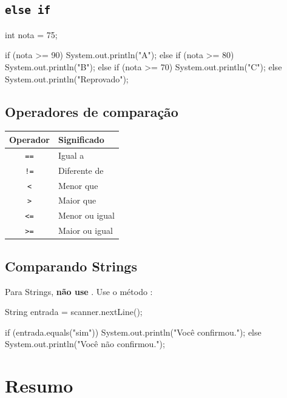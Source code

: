 \documentclass[11pt,a4paper]{article}
\begin{document}
\subsection{\texttt{else if}}

\begin{javacode}
int nota = 75;

if (nota >= 90) {
    System.out.println("A");
} else if (nota >= 80) {
    System.out.println("B");
} else if (nota >= 70) {
    System.out.println("C");
} else {
    System.out.println("Reprovado");
}
\end{javacode}

\subsection{Operadores de comparação}

\begin{center}
\begin{tabular}{c l}
\toprule
\textbf{Operador} & \textbf{Significado} \\
\midrule
\texttt{==} & Igual a       \\
\texttt{!=} & Diferente de  \\
\texttt{<}  & Menor que     \\
\texttt{>}  & Maior que     \\
\texttt{<=} & Menor ou igual \\
\texttt{>=} & Maior ou igual \\
\bottomrule
\end{tabular}
\end{center}

\subsection{Comparando Strings}

Para Strings, \textbf{não use \inlinecode{==}}. Use o método :

\begin{javacode}
String entrada = scanner.nextLine();

if (entrada.equals("sim")) {
    System.out.println("Você confirmou.");
} else {
    System.out.println("Você não confirmou.");
}
\end{javacode}

\section{Resumo}
\end{document}
